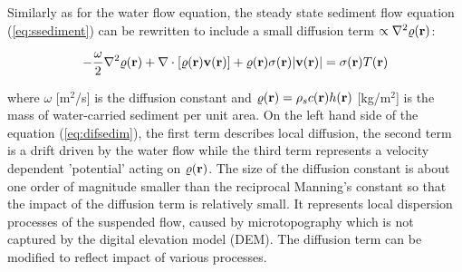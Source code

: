\documentclass[fleqn,12pt,twoside]{article}
\begin{document}
Similarly as for the water flow equation, the steady
state sediment flow equation (\ref{eq:ssediment}) can be rewritten to include a
small diffusion term
%
$\propto \nabla^2 \varrho({\bf r})$:

\begin{equation}
\label{eq:difsedim}
-{\omega \over 2}\nabla^2 \varrho({\bf r})
+ \nabla\cdot [\varrho({\bf r}){\bf v}({\bf r})]
 + \varrho({\bf r}) \sigma({\bf r}) |{\bf v}({\bf r})|
= \sigma({\bf r}) T({\bf r})
\end{equation}

\noindent
where  $\omega$ [m$^2$/s] is the diffusion constant and 
$\varrho({\bf r})= \rho_s c({\bf r})h({\bf r})$ [kg/m$^2$] is 
the mass of water-carried sediment per unit area.
 On the left hand side of the equation (\ref{eq:difsedim}), the first term
 describes local diffusion, the second term is a drift driven by the water flow
 while the third term represents a velocity dependent
'potential' acting on $\varrho({\bf r})$. The size of the diffusion
 constant is about one order of magnitude smaller than the
 reciprocal Manning's constant so that the impact of the diffusion term
is relatively small. It represents local dispersion processes
of the suspended flow, caused by microtopography
which is not captured by the digital elevation model (DEM).
The diffusion term can be modified to reflect impact of various processes.
\end{document}
